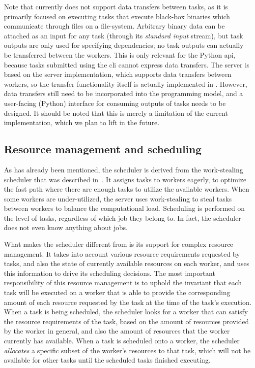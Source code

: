 Note that \hyperqueue{} currently does not support data transfers between tasks, as it is
primarily focused on executing tasks that execute black-box binaries which communicate through
files on a file-system. Arbitrary binary data can be attached as an input for any task (through its
\emph{standard input} stream), but task outputs are only used for specifying dependencies; no
task outputs can actually be transferred between the workers. This is only relevant for the Python
\gls{api}, because tasks submitted using the \gls{cli} cannot express
data transfers. The \hq{} server is based on the \rsds{} server
implementation, which supports data transfers between workers, so the transfer functionality itself
is actually implemented in \hq{}. However, data transfers still need to be
incorporated into the \hyperqueue{} programming model, and a user-facing (Python)
interface for consuming outputs of tasks needs to be designed. It should be noted that this is
merely a limitation of the current implementation, which we plan to lift in the future.

\subsection{Resource management and scheduling}
\label{sec:hq-resource-management}
As has already been mentioned, the \hyperqueue{} scheduler is derived from the
\rsds{} work-stealing scheduler that was described in~. It
assigns tasks to workers eagerly, to optimize the fast path where there are enough tasks to utilize
the available workers. When some workers are under-utilized, the server uses work-stealing to steal
tasks between workers to balance the computational load. Scheduling is performed on the level of
tasks, regardless of which job they belong to. In fact, the scheduler does not even know anything
about jobs.

What makes the scheduler different from \rsds{} is its support for complex resource
management. It takes into account various resource requirements requested by tasks, and also the
state of currently available resources on each worker, and uses this information to drive its
scheduling decisions. The most important responsibility of this resource management is to uphold
the invariant that each task will be executed on a worker that is able to provide the corresponding
amount of each resource requested by the task at the time of the task's execution. When a task is
being scheduled, the scheduler looks for a worker that can satisfy the resource requirements of the
task, based on the amount of resources provided by the worker in general, and also the amount of
resources that the worker currently has available. When a task is scheduled onto a worker, the
scheduler \emph{allocates} a specific subset of the worker's resources to that task, which
will not be available for other tasks until the scheduled tasks finished executing.

